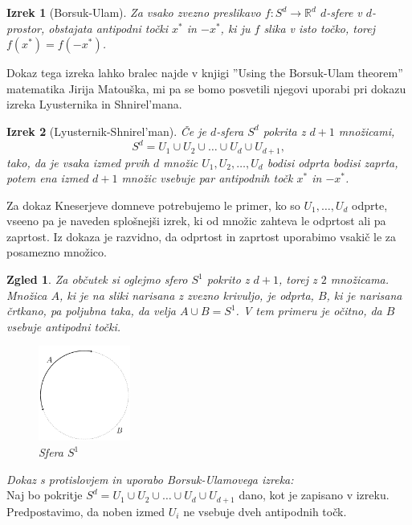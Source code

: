 \documentclass[a4paper,12pt]{article}
\newtheorem{izrek}{Izrek}
\newtheorem{zgled}{Zgled}
\begin{document}
\begin{izrek}[Borsuk-Ulam]
Za vsako zvezno preslikavo $f:S^d \rightarrow \mathbb{R}^d$ $d$-sfere v $d$-prostor, obstajata antipodni točki $x^*$ in $-x^*$, ki ju $f$ slika v isto točko, torej $f(x^*)=f(-x^*)$.
\end{izrek}

Dokaz tega izreka lahko bralec najde v knjigi ''Using the Borsuk-Ulam theorem'' matematika Jirija Matouška, mi pa se bomo posvetili njegovi uporabi pri dokazu izreka Lyusternika in Shnirel'mana.

\begin{izrek}[Lyusternik-Shnirel'man]
Če je $d$-sfera $S^d$ pokrita z $d+1$ množicami,
$$S^d = U_1 \cup U_2 \cup \ldots \cup U_d \cup U_{d+1},$$
tako, da je vsaka izmed prvih $d$ množic $U_1, U_2, \ldots, U_d$ bodisi odprta bodisi zaprta, potem ena izmed $d+1$ množic vsebuje par antipodnih točk $x^*$ in $-x^*$.
\end{izrek}

Za dokaz Kneserjeve domneve potrebujemo le primer, ko so $U_1, \ldots, U_d$ odprte, vseeno pa je naveden splošnejši izrek, ki od množic zahteva le odprtost ali pa zaprtost. Iz dokaza je razvidno, da odprtost in zaprtost uporabimo vsakič le za posamezno množico.

\newpage
\begin{zgled}{Za občutek si oglejmo sfero $S^1$ pokrito z $d+1$, torej z $2$ množicama. Množica $A$, ki je na sliki narisana z zvezno krivuljo, je odprta, $B$, ki je narisana črtkano, pa poljubna taka, da velja $A \cup B = S^1$. V tem primeru je očitno, da $B$ vsebuje antipodni točki. 
\begin{figure}[h!]
\centering
\includegraphics[width=0.27\textwidth]{sfera_s1}
\caption{Sfera $S^1$}
\end{figure}
}
\end{zgled}


\noindent
{\em Dokaz s protislovjem in uporabo Borsuk-Ulamovega izreka:} \\
\indent Naj bo pokritje $S^d = U_1 \cup U_2 \cup \ldots \cup U_d \cup U_{d+1}$ dano, kot je zapisano v izreku. Predpostavimo, da noben izmed $U_i$ ne vsebuje dveh antipodnih točk. 
\end{document}
